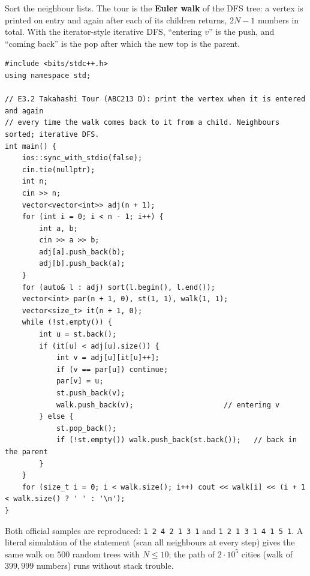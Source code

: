 \begin{solutionbox}
Sort the neighbour lists. The tour is the \textbf{Euler walk} of the DFS tree: a vertex is printed on entry and again after each of its children returns, $2N - 1$ numbers in total. With the iterator-style iterative DFS, ``entering $v$'' is the push, and ``coming back'' is the pop after which the new top is the parent.
\begin{lstlisting}[style=cpp]
#include <bits/stdc++.h>
using namespace std;

// E3.2 Takahashi Tour (ABC213 D): print the vertex when it is entered and again
// every time the walk comes back to it from a child. Neighbours sorted; iterative DFS.
int main() {
    ios::sync_with_stdio(false);
    cin.tie(nullptr);
    int n;
    cin >> n;
    vector<vector<int>> adj(n + 1);
    for (int i = 0; i < n - 1; i++) {
        int a, b;
        cin >> a >> b;
        adj[a].push_back(b);
        adj[b].push_back(a);
    }
    for (auto& l : adj) sort(l.begin(), l.end());
    vector<int> par(n + 1, 0), st(1, 1), walk(1, 1);
    vector<size_t> it(n + 1, 0);
    while (!st.empty()) {
        int u = st.back();
        if (it[u] < adj[u].size()) {
            int v = adj[u][it[u]++];
            if (v == par[u]) continue;
            par[v] = u;
            st.push_back(v);
            walk.push_back(v);                     // entering v
        } else {
            st.pop_back();
            if (!st.empty()) walk.push_back(st.back());   // back in the parent
        }
    }
    for (size_t i = 0; i < walk.size(); i++) cout << walk[i] << (i + 1 < walk.size() ? ' ' : '\n');
}
\end{lstlisting}
Both official samples are reproduced: \texttt{1 2 4 2 1 3 1} and \texttt{1 2 1 3 1 4 1 5 1}. A literal simulation of the statement (scan all neighbours at every step) gives the same walk on $500$ random trees with $N \le 10$; the path of $2\cdot10^5$ cities (walk of $399{,}999$ numbers) runs without stack trouble.
\end{solutionbox}

